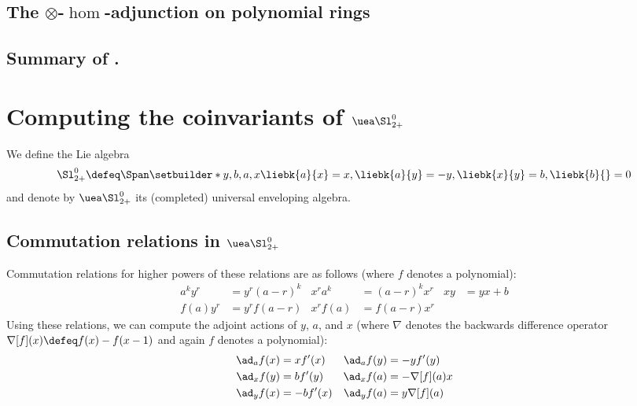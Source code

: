 \documentclass{article}
\begin{document}
\subsection{The $\otimes$-$\hom$-adjunction on polynomial rings}
\subsection{Summary of \cite{bv}.}

\section{Computing the coinvariants of $\CU$}
\begin{definition}
       We define the Lie algebra
       \begin{equation}
               \Alg \defeq
               \Span\setbuilder*{y, b, a, x}{
                       \liebk{a}{x}=x,
                       \liebk{a}{y}=-y,
                       \liebk{x}{y}=b,
                       \liebk{b}{}=0
               }
       \end{equation}
       and denote by $\CU$ its (completed) universal enveloping algebra.
\end{definition}

\subsection{Commutation relations in $\CU$}
Commutation relations for higher powers of these relations are as follows (where
$f$ denotes a polynomial):
\begin{align}
        a^ky^r &= y^r(a-r)^{k} &
        x^ra^{k} &= (a-r)^kx^r &
        xy &= yx + b
        \\
        f(a)y^r &= y^rf(a-r) &
        x^rf(a) &= f(a-r)x^r &
\end{align}
Using these relations, we can compute the adjoint actions of $y$, $a$, and $x$
(where $\nabla$ denotes the backwards difference operator $\nabla[f](x) \defeq
f(x) - f(x-1)$ and again $f$ denotes a polynomial):
\begin{align}
  \ad_a f(x) &= xf'(x)&
  \ad_a f(y) &= -yf'(y)\label{eq:ada}\\
  \ad_x f(y) &= bf'(y) &
  \ad_x f(a) &= -\nabla[f](a)x\label{eq:adx}\\
  \ad_y f(x) &= -bf'(x) &
  \ad_y f(a) &= y\nabla[f](a)\label{eq:ady}
\end{align}
\end{document}
